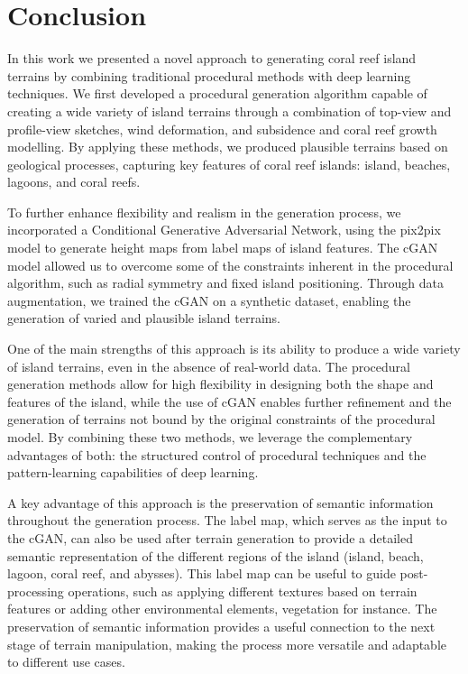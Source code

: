 \section{Conclusion}%
\label{sec:coral-island-conclusion}

In this work we presented a novel approach to generating coral reef island terrains by combining traditional procedural methods with deep learning techniques. We first developed a procedural generation algorithm capable of creating a wide variety of island terrains through a combination of top-view and profile-view sketches, wind deformation, and subsidence and coral reef growth modelling. By applying these methods, we produced plausible terrains based on geological processes, capturing key features of coral reef islands: island, beaches, lagoons, and coral reefs.

To further enhance flexibility and realism in the generation process, we incorporated a Conditional Generative Adversarial Network, using the pix2pix model to generate height maps from label maps of island features. The cGAN model allowed us to overcome some of the constraints inherent in the procedural algorithm, such as radial symmetry and fixed island positioning. Through data augmentation, we trained the cGAN on a synthetic dataset, enabling the generation of varied and plausible island terrains.



One of the main strengths of this approach is its ability to produce a wide variety of island terrains, even in the absence of real-world data. The procedural generation methods allow for high flexibility in designing both the shape and features of the island, while the use of cGAN enables further refinement and the generation of terrains not bound by the original constraints of the procedural model. By combining these two methods, we leverage the complementary advantages of both: the structured control of procedural techniques and the pattern-learning capabilities of deep learning.

A key advantage of this approach is the preservation of semantic information throughout the generation process. The label map, which serves as the input to the cGAN, can also be used after terrain generation to provide a detailed semantic representation of the different regions of the island (island, beach, lagoon, coral reef, and abysses). This label map can be useful to guide post-processing operations, such as applying different textures based on terrain features or adding other environmental elements, vegetation for instance. The preservation of semantic information provides a useful connection to the next stage of terrain manipulation, making the process more versatile and adaptable to different use cases.

